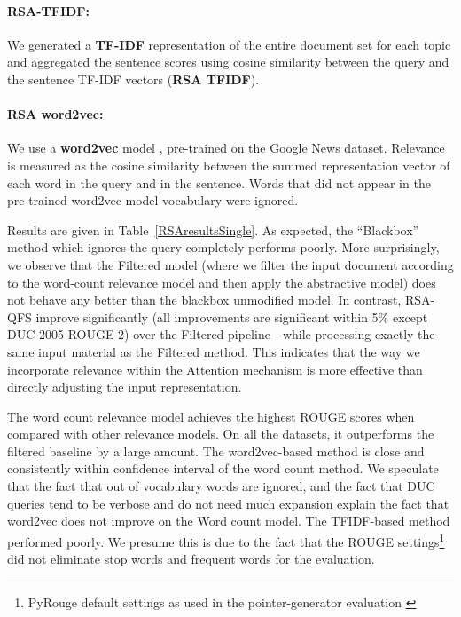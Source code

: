 \documentclass[11pt,a4paper]{article}
\begin{document}
\paragraph{RSA-TFIDF:} We generated a \textbf{TF-IDF} representation of the entire document set for each topic and aggregated the sentence scores using cosine similarity between the query and the sentence TF-IDF vectors (\textbf{RSA TFIDF}).

\paragraph{RSA word2vec:} We use a \textbf{word2vec} model \cite{mikolov2013distributed}, pre-trained on the Google News dataset. Relevance is measured as the cosine similarity between the summed representation vector of each word in the query and in the sentence. Words that did not appear in the pre-trained word2vec model vocabulary were ignored.

Results are given in Table~\ref{RSAresultsSingle}.  
As expected, the ``Blackbox'' method which ignores the query completely performs poorly.  
More surprisingly, we observe that the Filtered model (where we filter the input document according to the word-count relevance model and then apply the abstractive model) does not behave any better than the blackbox unmodified model.  In contrast, RSA-QFS improve significantly (all improvements are significant within 5\% except DUC-2005 ROUGE-2) over the Filtered pipeline - while processing exactly the same input material as the Filtered method.  This indicates that the way we incorporate relevance within the Attention mechanism is more effective than directly adjusting the input representation.

The word count relevance model achieves the highest ROUGE scores when compared with other relevance models. On all the datasets, it outperforms the filtered baseline by a large amount. The word2vec-based method is close and consistently within confidence interval of the word count method. We speculate that the fact that out of vocabulary words are ignored, and the fact that DUC queries tend to be verbose and do not need much expansion explain the fact that word2vec does not improve on the Word count model. The TFIDF-based method performed poorly. We presume this is due to the fact that the ROUGE settings\footnote{PyRouge default settings as used in the pointer-generator evaluation \cite{DBLP:journals/corr/SeeLM17}} did not eliminate stop words and frequent words for the evaluation.
\end{document}
